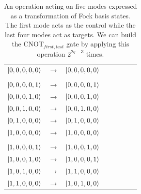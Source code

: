 \documentclass[aps,pra,twocolumn,showpacs,superscriptaddress,floatfix,10pt]{revtex4}
\begin{document}
\begin {table}[h]
\begin{center}
	\begin{tabular}{l*{6}{c}r} 
		$\ket{0,0,0,0,0}$  &  $\rightarrow$ & $\ket{0,0,0,0,0}$ \\ \\
		$\ket{0,0,0,0,1}$  & $\rightarrow$ & $\ket{0,0,0,0,1}$ \\
		$\ket{0,0,0,1,0}$ & $\rightarrow$ & $\ket{0,0,0,1,0}$ \\
		$\ket{0,0,1,0,0}$ & $\rightarrow$ & $\ket{0,0,1,0,0} $ \\ 
		$\ket{0,1,0,0,0}$ & $\rightarrow$ & $\ket{0,1,0,0,0} $\\
		$\ket{1,0,0,0,0}$ & $\rightarrow$ & $\ket{1,0,0,0,0} $ \\ \\
		$\ket{1,0,0,0,1}$  & $\rightarrow$ & $\ket{1,0,0,1,0}$ \\
		$\ket{1,0,0,1,0}$  & $\rightarrow$ & $\ket{1,0,0,0,1}$ \\
		$\ket{1,0,1,0,0}$  & $\rightarrow$ & $\ket{1,1,0,0,0}$ \\
		$\ket{1,1,0,0,0}$  & $\rightarrow$ & $\ket{1,0,1,0,0}$ \\
	\end{tabular}
	\caption{ \label{One Control Four Targets} An operation acting on five modes expressed as a transformation of Fock basis states. The first mode acts as the control while the last four modes act as targets. We can build the $\mbox{CNOT}_{first,last}$ gate by applying this operation $2^{2 q - 3}$ times.}
\end{center}
\end{table}
\end{document}
